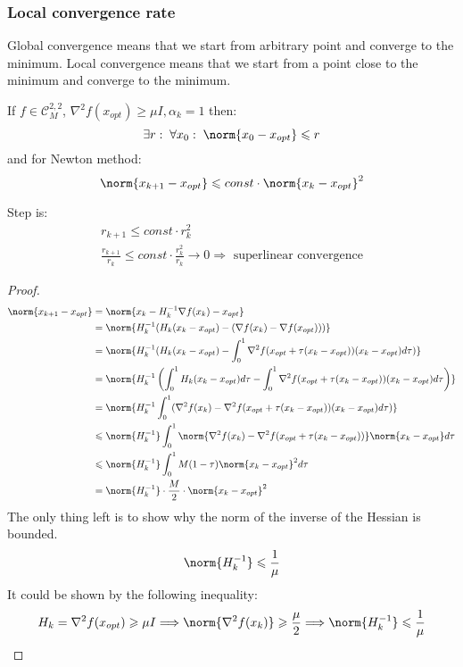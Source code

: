 \subsubsection{Local convergence rate}

Global convergence means that we start from arbitrary point and converge to the minimum. Local convergence means that we start from a point close to the minimum and converge to the minimum.

\begin{theorem}
    If $f \in \mathcal{C}^{2, 2}_M$, $\nabla^2 f(x_{opt}) \geqslant \mu I, \alpha_k = 1$ then: 
    \[
        \exists r : \; \forall x_0 : \; \norm{x_0 - x_{opt}} \leqslant r
    \]
    and for Newton method: 
    \[ 
        \norm{x_{k+1} - x_{opt}} \leqslant const \cdot \norm{x_k - x_{opt}}^2
    \]

    Step is: 
    \begin{gather*}
        r_{k+1} \leqslant const \cdot r_k^2 \\ 
        \frac{r_{k+1}}{r_k} \leqslant const \cdot \frac{r_k^2}{r_k} \to 0 \Longrightarrow \text{ superlinear convergence}
    \end{gather*}
\end{theorem}
\begin{proof}
    \begin{align*}
        \norm{x_{k+1} - x_{opt}} &= \norm{x_k - H_k^{-1} \nabla f(x_k) - x_{opt}} \\ 
        &= \norm{H_k^{-1} (H_k (x_k - x_{opt}) - (\nabla f(x_k) - \nabla f(x_{opt})))} \\
        &= \norm{H_k^{-1} (H_k (x_k - x_{opt}) - \int_0^1 \nabla^2 f(x_{opt} + \tau (x_k - x_{opt})) (x_k - x_{opt}) d \tau)} \\
        &= \norm{H_k^{-1} \left( \int_0^1 H_k (x_k - x_{opt}) d \tau - \int_0^1 \nabla^2 f(x_{opt} + \tau (x_k - x_{opt})) (x_k - x_{opt}) d \tau \right)} \\
        &= \norm{H_k^{-1} \int_0^1 (\nabla^2 f(x_k) - \nabla^2 f(x_{opt} + \tau (x_k - x_{opt})) (x_k - x_{opt}) d \tau)} \\ 
        &\leqslant \norm{H_k^{-1}} \int_0^1 \norm{\nabla^2 f(x_k) - \nabla^2 f(x_{opt} + \tau (x_k - x_{opt}))} \norm{x_k - x_{opt}} d \tau \\
        &\leqslant \norm{H_k^{-1}} \int_0^1 M (1 - \tau) \norm{x_k - x_{opt}}^2 d \tau \\
        &= \norm{H_k^{-1}} \cdot \frac{M}{2} \cdot \norm{x_k - x_{opt}}^2 \\
    \end{align*}
    The only thing left is to show why the norm of the inverse of the Hessian is bounded.
    \[
        \norm{H_k^{-1}} \leqslant \frac{1}{\mu}
    \]
    It could be shown by the following inequality:
    \[
        H_k = \nabla^2 f(x_{opt}) \geqslant \mu I \Longrightarrow \norm{ \nabla^2 f(x_{k})} \geqslant \frac{\mu}{2} \Longrightarrow \norm{H_k^{-1}} \leqslant \frac{1}{\mu}
    \]
\end{proof}

